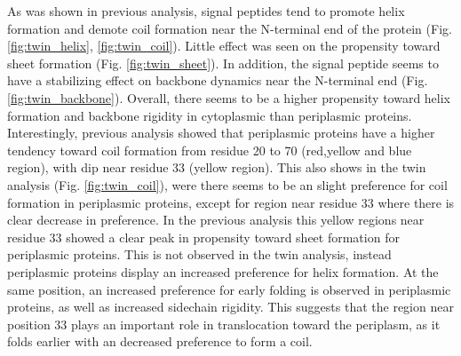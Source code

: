 
As was shown in previous analysis,
signal peptides tend to promote helix formation and demote coil formation near the N-terminal end of the protein (Fig. \ref{fig:twin_helix}, \ref{fig:twin_coil}).
Little effect was seen on the propensity toward sheet formation (Fig. \ref{fig:twin_sheet}).
In addition, the signal peptide seems to have a stabilizing effect on backbone dynamics near the N-terminal end (Fig. \ref{fig:twin_backbone}).
Overall, there seems to be a higher propensity toward helix formation and backbone rigidity in cytoplasmic than periplasmic proteins.
Interestingly, previous analysis showed that periplasmic proteins have a higher tendency toward coil formation from residue 20 to 70 (red,yellow and blue region), with dip near residue 33 (yellow region).
This also shows in the twin analysis (Fig. \ref{fig:twin_coil}),
were there seems to be an slight preference for coil formation in periplasmic proteins, 
except for region near residue 33 where there is clear decrease in preference.
In the previous analysis this yellow regions near residue 33 showed a clear peak in propensity toward sheet formation for periplasmic proteins.
This is not observed in the twin analysis, 
instead periplasmic proteins display an increased preference for helix formation.
At the same position, an increased preference for early folding is observed in periplasmic proteins,
as well as increased sidechain rigidity.
This suggests that the region near position 33 plays an important role in translocation toward the periplasm,
as it folds earlier with an decreased preference to form a coil.

